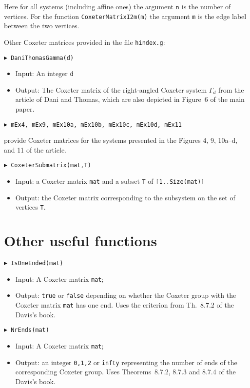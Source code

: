 \documentclass[10pt]{amsart}
\begin{document}
\bigskip
\noindent
Here for all systems (including affine ones) the argument $\mathtt n$ is the number of vertices. For the function {\tt CoxeterMatrixI2m(m)} the argument {\tt m} is the edge label between the two vertices.


\bigskip
\noindent
Other Coxeter matrices provided in the file {\tt hindex.g}:

\bigskip
\noindent
{\tt $\blacktriangleright$ DaniThomasGamma(d)}
\noindent 
\begin{itemize}
\item{} Input: An integer {\tt d}
\item{} Output: The Coxeter matrix of the right-angled Coxeter system $\Gamma_d$ from the article of Dani and Thomas, which are also depicted in Figure~6 of the main paper.
\end{itemize}


\bigskip
\noindent
{\tt $\blacktriangleright$ mEx4, mEx9, mEx10a, mEx10b, mEx10c, mEx10d, mEx11}

\noindent
provide Coxeter matrices for the systems presented in the Figures 4, 9, 10a--d, and 11 of the article.

\bigskip
\noindent
{\tt $\blacktriangleright$ CoxeterSubmatrix(mat,T)}
\noindent 
\begin{itemize}
\item{} Input: a Coxeter matrix {\tt mat} and a subset {\tt T} of {\tt [1..Size(mat)]}
\item{} Output: the Coxeter matrix corresponding to the subsystem on the set of vertices {\tt T}.
\end{itemize}




\bigskip
\section{Other useful functions}

\noindent
{\tt $\blacktriangleright$ IsOneEnded(mat)}
\noindent 
\begin{itemize}
\item{} Input: A Coxeter matrix {\tt mat};
\item{} Output: {\tt true} or {\tt false} depending on whether the Coxeter group with the Coxeter matrix {\tt mat} has one end. Uses the criterion from Th.~8.7.2 of the Davis's book.
\end{itemize}

\bigskip\noindent
{\tt $\blacktriangleright$ NrEnds(mat)}
\noindent 
\begin{itemize}
\item{} Input: A Coxeter matrix {\tt mat};
\item{} Output: an integer {\tt 0,1,2} or {\tt infty} representing the number of ends of the corresponding Coxeter group. Uses Theorems~8.7.2, 8.7.3 and 8.7.4 of the Davis's book.
\end{itemize}
\end{document}

